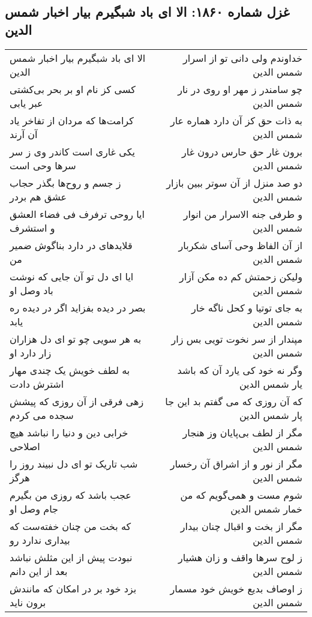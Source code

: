 \begin{center}
\section*{غزل شماره ۱۸۶۰: الا ای باد شبگیرم بیار اخبار شمس الدین}
\label{sec:1860}
\begin{longtable}{l p{0.5cm} r}
الا ای باد شبگیرم بیار اخبار شمس الدین
&&
خداوندم ولی دانی تو از اسرار شمس الدین
\\
کسی کز نام او بر بحر بی‌کشتی عبر یابی
&&
چو سامندر ز مهر او روی در نار شمس الدین
\\
کرامت‌ها که مردان از تفاخر یاد آن آرند
&&
به ذات حق کز آن دارد هماره عار شمس الدین
\\
یکی غاری است کاندر وی ز سر سرها وحی است
&&
برون غار حق حارس درون غار شمس الدین
\\
ز جسم و روح‌ها بگذر حجاب عشق هم بردر
&&
دو صد منزل از آن سوتر ببین بازار شمس الدین
\\
ایا روحی ترفرف فی فضاء العشق و استشرف
&&
و طرفی جنه الاسرار من انوار شمس الدین
\\
قلایدهای در دارد بناگوش ضمیر من
&&
از آن الفاظ وحی آسای شکربار شمس الدین
\\
ایا ای دل تو آن جایی که نوشت باد وصل او
&&
ولیکن زحمتش کم ده مکن آزار شمس الدین
\\
بصر در دیده بفزاید اگر در دیده ره یابد
&&
به جای توتیا و کحل ناگه خار شمس الدین
\\
به هر سویی چو تو ای دل هزاران زار دارد او
&&
مپندار از سر نخوت تویی بس زار شمس الدین
\\
به لطف خویش یک چندی مهار اشترش دادت
&&
وگر نه خود کی یارد آن که باشد یار شمس الدین
\\
زهی فرقی از آن روزی که پیشش سجده می کردم
&&
که آن روزی که می گفتم بد این جا پار شمس الدین
\\
خرابی دین و دنیا را نباشد هیچ اصلاحی
&&
مگر از لطف بی‌پایان وز هنجار شمس الدین
\\
شب تاریک تو ای دل نبیند روز را هرگز
&&
مگر از نور و از اشراق آن رخسار شمس الدین
\\
عجب باشد که روزی من بگیرم جام وصل او
&&
شوم مست و همی‌گویم که من خمار شمس الدین
\\
که بخت من چنان خفته‌ست که بیداری ندارد رو
&&
مگر از بخت و اقبال چنان بیدار شمس الدین
\\
نبودت پیش از این مثلش نباشد بعد از این دانم
&&
ز لوح سرها واقف و زان هشیار شمس الدین
\\
بزد خود بر در امکان که مانندش برون ناید
&&
ز اوصاف بدیع خویش خود مسمار شمس الدین

\end{longtable}
\end{center}
